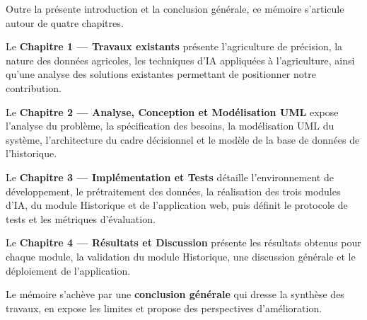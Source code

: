 Outre la présente introduction et la conclusion générale, ce
mémoire s'articule autour de quatre chapitres.

\medskip

Le \textbf{Chapitre 1 --- Travaux existants} présente l'agriculture
de précision, la nature des données agricoles, les techniques d'IA
appliquées à l'agriculture, ainsi qu'une analyse des solutions
existantes permettant de positionner notre contribution.

\medskip

Le \textbf{Chapitre 2 --- Analyse, Conception et Modélisation UML}
expose l'analyse du problème, la spécification des besoins, la
modélisation UML du système, l'architecture du cadre décisionnel
et le modèle de la base de données de l'historique.

\medskip

Le \textbf{Chapitre 3 --- Implémentation et Tests} détaille
l'environnement de développement, le prétraitement des données,
la réalisation des trois modules d'IA, du module Historique et de
l'application web, puis définit le protocole de tests et les
métriques d'évaluation.

\medskip

Le \textbf{Chapitre 4 --- Résultats et Discussion} présente les
résultats obtenus pour chaque module, la validation du module
Historique, une discussion générale et le déploiement de
l'application.

\medskip

Le mémoire s'achève par une \textbf{conclusion générale} qui
dresse la synthèse des travaux, en expose les limites et propose
des perspectives d'amélioration.